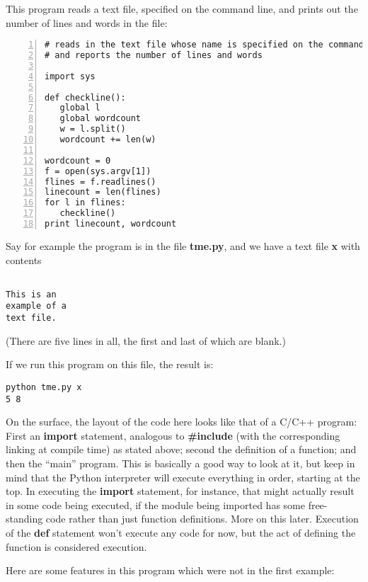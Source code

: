This program reads a text file, specified on the command line, and
prints out the number of lines and words in the file:

\begin{Verbatim}[fontsize=\relsize{-2},numbers=left]
# reads in the text file whose name is specified on the command line,
# and reports the number of lines and words

import sys

def checkline():
   global l
   global wordcount
   w = l.split()
   wordcount += len(w)

wordcount = 0
f = open(sys.argv[1])
flines = f.readlines()
linecount = len(flines)  
for l in flines:
   checkline()
print linecount, wordcount
\end{Verbatim}

Say for example the program is in the file {\bf tme.py}, and we have a
text file {\bf x} with contents

\begin{Verbatim}[fontsize=\relsize{-2}]

This is an
example of a 
text file.

\end{Verbatim}

(There are five lines in all, the first and last of which are blank.)

If we run this program on this file, the result is:

\begin{Verbatim}[fontsize=\relsize{-2}]
python tme.py x
5 8
\end{Verbatim}

On the surface, the layout of the code here looks like that of a C/C++
program:  First an {\bf import} statement, analogous to {\bf \#include}
(with the corresponding linking at compile time) as stated above; second
the definition of a function; and then the ``main'' program.  This is
basically a good way to look at it, but keep in mind that the Python
interpreter will execute everything in order, starting at the top.  In
executing the {\bf import} statement, for instance, that might actually
result in some code being executed, if the module being imported has
some free-standing code rather than just function definitions.  More on
this later.  Execution of the {\bf def} statement won't execute any code
for now, but the act of defining the function is considered execution.

Here are some features in this program which were not in the first
example:

